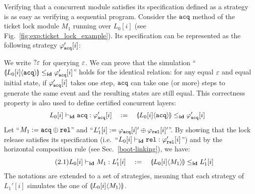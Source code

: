 Verifying that a concurrent module satisfies its specification 
defined as a strategy is as easy as verifying a sequential program.
Consider the $\codeinmath{acq}$ method of the ticket lock module $M_1$ running 
over $L_0[i]$ (see Fig.~\ref{fig:exp:ticket_lock_example}). 
Its  specification
can be represented as the following strategy $\strat{\codeinmath{acq}}'[i]$:
\begin{center}
\end{center}
We write $?\oracle$ for querying $\oracle$.
We can prove that the simulation ``$\ssem{\codeinmath{acq}}{L_0[i]}\le_\id \strat{\codeinmath{acq}}'[i]$'' holds for the identical relation: for any equal $\oracle$
and equal initial state, if $\strat{\codeinmath{acq}}'[i]$ takes one step, $\codeinmath{acq}$ can take one (or more) steps to generate the same event and the resulting states are still equal. This correctness property is also used to define certified concurrent layers:
$$\ltyp{L_0[i]}{\id}{\codeinmath{acq}}{\strat{\codeinmath{acq}}'[i]}
\quad := \quad  \ssem{\codeinmath{acq}}{L_0[i]}\le_\id \strat{\codeinmath{acq}}'[i]$$
Let ``$M_1:= \codeinmath{acq} \oplus \codeinmath{rel}$''
and ``$L_1'[i]:= \strat{\codeinmath{acq}}[i]'\oplus \strat{\codeinmath{rel}}[i]'$''. By showing that the lock release    satisfies its specification
(i.e.\, ``$\ltyp{L_0[i]}{\id}{\codeinmath{rel}}{\strat{\codeinmath{rel}}'[i]}$'')
and by the horizontal composition rule (see Sec.~\ref{boot-linking}), we have:
\begin{equation} \label{eq:acq} \tag{2.1}
\ltyp{L_0[i]}{\id}{M_1}{L_1'[i]}\quad:=\quad \ssem{M_1}{L_0[i]}\le_\id L_1'[i]
\end{equation}
The notations are extended to a set of strategies,  meaning that each strategy of $L_1'[i]$ simulates the one of $\ssem{M_1}{L_0[i]}$. 

